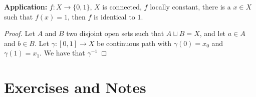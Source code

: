 \textbf{Application:} \(f: X \longrightarrow \{0, 1\}\), \(X\) is connected, \(f\) locally constant, there is a \(x \in X\) such that \(f(x) = 1\), then \(f\) is identical to \(1\).

\begin{proof}
    Let \(A\) and \(B\) two disjoint open sets such that \(A \sqcup B = X\), and let \(a \in A\) and \(b \in B\). Let \(\gamma: [0, 1] \longrightarrow X\) be continuous path with \(\gamma(0) = x_0\) and \(\gamma(1) = x_1\). We have that \(\gamma^{-1}\)
\end{proof}

\newpage
\section{Exercises and Notes}
